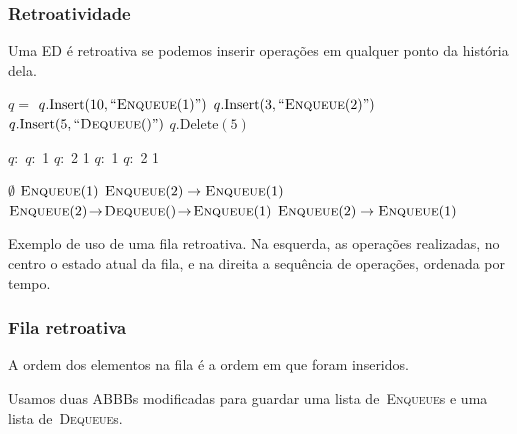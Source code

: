 \documentclass[10pt, compress]{beamer}
\begin{document}
\begin{frame}[fragile]
	\frametitle{Retroatividade}
	Uma ED é retroativa se podemos inserir operações em qualquer ponto da história dela.
	\vfill

	\begin{table} \footnotesize
	\begin{subalgorithm}{0.34\textwidth}
	\begin{algorithmic}
		\State $q =$ 
		\State $q.\text{Insert}(10, ``\Call{Enqueue}{1}")$
		\State $q.\text{Insert}(3, ``\Call{Enqueue}{2}")$
		\State $q.\text{Insert}(5, ``\Call{Dequeue}{\null}")$
		\State $q.\text{Delete}(5)$
	\end{algorithmic}
	\end{subalgorithm}%
	\vrule
	\begin{subalgorithm}{0.14\textwidth}
	\begin{algorithmic}
		\State $q:$
		\State $q:$ 1
		\State $q:$ 2 1
		\State $q:$ 1
		\State $q:$ 2 1
	\end{algorithmic}
	\end{subalgorithm} \vrule
	\begin{subalgorithm}{0.5\textwidth}
	\begin{algorithmic}
		\State $\emptyset$
		\State $\Call{Enqueue}{1}$
		\State $\Call{Enqueue}{2} \rightarrow \Call{Enqueue}{1}$
		\State $\Call{Enqueue}{2}\!\rightarrow\!\Call{Dequeue}{\null}\!\rightarrow\!\Call{Enqueue}{1}$
		\State $\Call{Enqueue}{2} \rightarrow \Call{Enqueue}{1}$
	\end{algorithmic}
	\end{subalgorithm}%
	\caption{Exemplo de uso de uma fila retroativa. Na esquerda, as operações realizadas, no centro o estado atual da fila, e na direita a sequência de operações, ordenada por tempo.}
	\end{table}%

\end{frame}

\begin{frame}[fragile]
	\frametitle{Fila retroativa}

	A ordem dos elementos na fila é a ordem em que foram inseridos.
	\vfill

	Usamos duas ABBBs modificadas para guardar uma lista de~\textsc{Enqueue}s e uma lista de~\textsc{Dequeue}s.
	\vfill

\end{frame}
\end{document}
